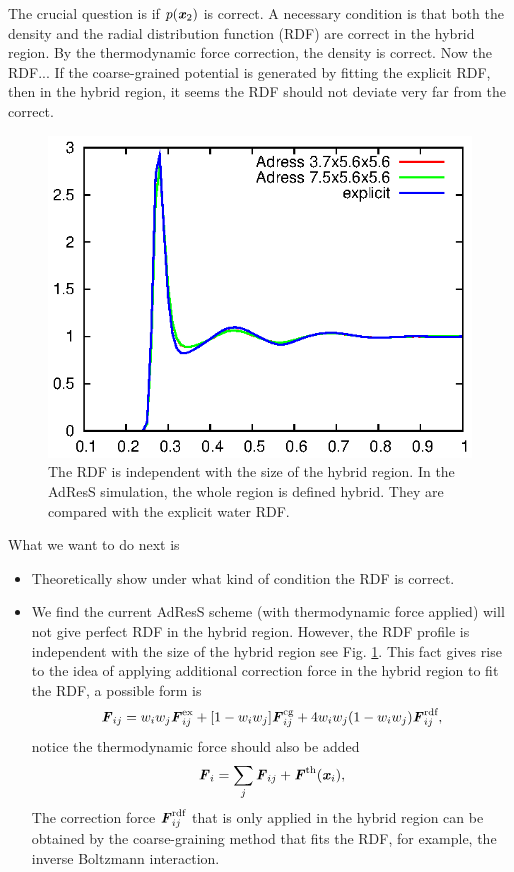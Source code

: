 \documentclass[aps,pre,preprint,unsortedaddress]{revtex4}
\newcommand{\redc}[1]{{\color{red} #1}}
\newcommand{\bluec}[1]{{\color{blue} #1}}
\renewcommand{\v}[1]{\textbf{\textit{#1}}}
\begin{document}
The crucial question is if $p(\v x_2)$ is correct.  A necessary
condition is that both the density and the radial distribution
function (RDF) are correct in the hybrid region. By the thermodynamic
force correction, the density is correct. Now the RDF...  If the
coarse-grained potential is generated by fitting the explicit RDF,
\redc{then in the hybrid region, it seems the RDF should not deviate very
  far from the correct.}

\begin{figure}
  \centering
  \includegraphics[]{fig/old.rdf/rdfs.eps}
  \caption{The RDF is independent with the size of the hybrid region.
    In the AdResS simulation, the whole region is defined hybrid. They
    are compared with the explicit water RDF.}
  \label{fig:tmp2}
\end{figure}

\bluec{
  What we want to do next is
  \begin{itemize}
  \item Theoretically show under what kind of condition the RDF is
    correct.
  \item We find the current AdResS scheme (with thermodynamic force
    applied) will not give perfect RDF in the hybrid region. However,
    the RDF profile is independent with the size of the hybrid region
    see Fig. \ref{fig:tmp2}. This fact gives rise to the idea of
    applying additional correction force in the hybrid region to fit
    the RDF, a possible form is
    \begin{align}
      \v F_{ij} = w_iw_j\v F^{\textrm{ex}}_{ij} + [1-w_iw_j]\v F^{\textrm{cg}}_{ij} +
      4 w_iw_j (1 - w_iw_j)\v F_{ij}^{\textrm{rdf}},
    \end{align}
    notice the thermodynamic force should also be added
    \begin{align}
      \v F_i = \sum_j\v F_{ij} + \v F^{\textrm{th}}(\v x_i),
    \end{align}
    The correction force $\v F_{ij}^{\textrm{rdf}}$ that is only
    applied in the hybrid region can be obtained by the
    coarse-graining method that fits the RDF, for example, the inverse
    Boltzmann interaction. 
  \end{itemize}
}
  
\end{document}
